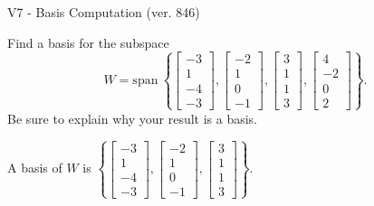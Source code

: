 \begin{exercise}
  \begin{exerciseTitle}V7 - Basis Computation (ver. 846)\end{exerciseTitle}
  \begin{exerciseStatement}
    Find a basis for the subspace 
\[W=\mathrm{span}\ \left\{\left[\begin{array}{r}
-3 \\
1 \\
-4 \\
-3
\end{array}\right] , \left[\begin{array}{r}
-2 \\
1 \\
0 \\
-1
\end{array}\right] , \left[\begin{array}{r}
3 \\
1 \\
1 \\
3
\end{array}\right] , \left[\begin{array}{r}
4 \\
-2 \\
0 \\
2
\end{array}\right]\right\}.\]
 Be sure to explain why your result is a basis.


  \end{exerciseStatement}
  \begin{exerciseAnswer}
   A basis of \(W\) is  \(\left\{\left[\begin{array}{r}
-3 \\
1 \\
-4 \\
-3
\end{array}\right] , \left[\begin{array}{r}
-2 \\
1 \\
0 \\
-1
\end{array}\right] , \left[\begin{array}{r}
3 \\
1 \\
1 \\
3
\end{array}\right]\right\}\).
  


  \end{exerciseAnswer}
\end{exercise}